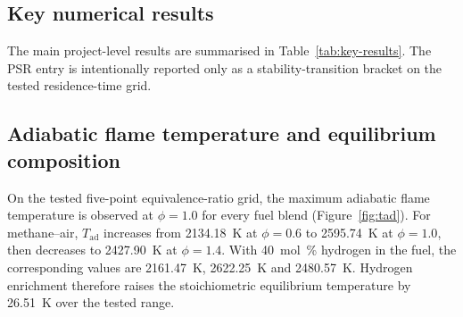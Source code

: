 \documentclass[11pt]{article}
\begin{document}
\subsection{Key numerical results}
The main project-level results are summarised in
Table~\ref{tab:key-results}. The PSR entry is intentionally reported only as a
stability-transition bracket on the tested residence-time grid.

\begin{table}[htbp]
  \centering
  \caption{Selected headline results for methane--air and the
           \SI{40}{\percent} hydrogen fuel blend.}
  \label{tab:key-results}
\end{table}

\subsection{Adiabatic flame temperature and equilibrium composition}
On the tested five-point equivalence-ratio grid, the maximum adiabatic flame
temperature is observed at $\phi=1.0$ for every fuel blend
(Figure~\ref{fig:tad}). For methane--air, $T_\mathrm{ad}$ increases from
\SI{2134.18}{\kelvin} at $\phi=0.6$ to \SI{2595.74}{\kelvin} at $\phi=1.0$,
then decreases to \SI{2427.90}{\kelvin} at $\phi=1.4$. With
\SI{40}{\mole\percent} hydrogen in the fuel, the corresponding values are
\SI{2161.47}{\kelvin}, \SI{2622.25}{\kelvin} and
\SI{2480.57}{\kelvin}. Hydrogen enrichment therefore raises the
stoichiometric equilibrium temperature by \SI{26.51}{\kelvin} over the tested
range.
\end{document}
